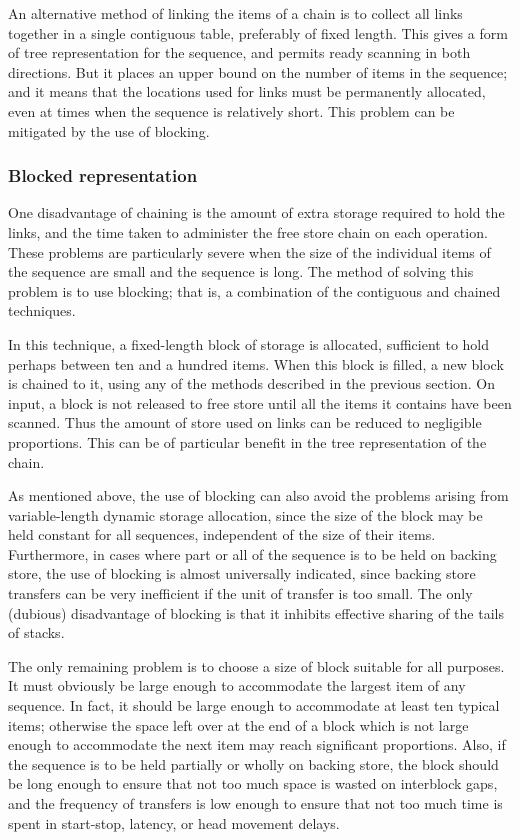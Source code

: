 \documentclass[twoside,11pt]{book}
\begin{document}
An alternative method of linking the items of a chain is to collect all links together in a single contiguous table, preferably of fixed length. This gives a form of tree representation for the sequence, and permits ready scanning in both directions. But it places an upper bound on the number of items in the sequence; and it means that the locations used for links must be permanently allocated, even at times when the sequence is relatively short. This problem can be mitigated by the use of blocking.

\subsubsection{Blocked representation}

One disadvantage of chaining is the amount of extra storage required to hold the links, and the time taken to administer the free store chain on each operation. These problems are particularly severe when the size of the individual items of the sequence are small and the sequence is long. The method of solving this problem is to use blocking; that is, a combination of the contiguous and chained techniques.

In this technique, a fixed-length block of storage is allocated, sufficient to hold perhaps between ten and a hundred items. When this block is filled, a new block is chained to it, using any of the methods described in the previous section. On input, a block is not released to free store until all the items it contains have been scanned. Thus the amount of store used on links can be reduced to negligible proportions. This can be of particular benefit in the tree representation of the chain.

As mentioned above, the use of blocking can also avoid the problems arising from variable-length dynamic storage allocation, since the size of the block may be held constant for all sequences, independent of the size of their items. Furthermore, in cases where part or all of the sequence is to be held on backing store, the use of blocking is almost universally indicated, since backing store transfers can be very inefficient if the unit of transfer is too small. The only (dubious) disadvantage of blocking is that it inhibits effective sharing of the tails of stacks.

The only remaining problem is to choose a size of block suitable for all purposes. It must obviously be large enough to accommodate the largest item of any sequence. In fact, it should be large enough to accommodate at least ten typical items; otherwise the space left over at the end of a block which is not large enough to accommodate the next item may reach significant proportions. Also, if the sequence is to be held partially or wholly on backing store, the block should be long enough to ensure that not too much space is wasted on interblock gaps, and the frequency of transfers is low enough to ensure that not too much time is spent in start-stop, latency, or head movement delays.
\end{document}
